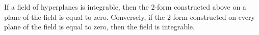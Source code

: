If a field of hyperplanes is integrable, then the $2$-form constructed above on a plane of the field is equal to zero. Conversely, if the $2$-form constructed on every plane of the field is equal to zero, then the field is integrable.
